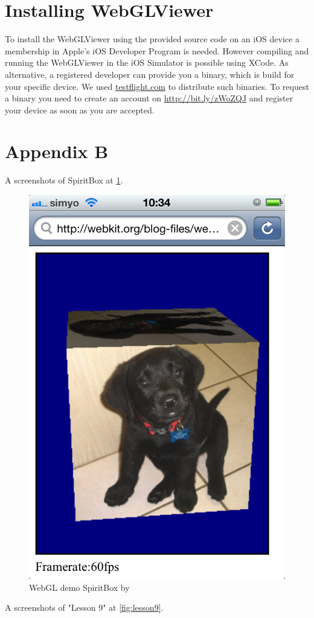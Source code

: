 \documentclass[12pt,journal,compsoc]{IEEEtran}
\begin{document}
\appendices
\section*{Installing WebGLViewer}
To install the WebGLViewer using the provided source code on an iOS device a membership in Apple's iOS Developer Program is needed. However compiling and running the WebGLViewer in the iOS Simulator is possible using XCode. As alternative, a registered developer can provide you a binary, which is build for your specific device. We used \url{testflight.com} to distribute such binaries. To request a binary you need to create an account on \url{http://bit.ly/zWoZQJ} and register your device as soon as you are accepted.

\section*{Appendix B}
A screenshots of SpiritBox at \ref{fig:spiritbox}.
\begin{figure}
	\centerline{\includegraphics[width=0.7\columnwidth]{grafiken/SpiritBox}}
	\caption{WebGL demo SpiritBox by \cite{SpiritBox}}
	\label{fig:spiritbox}
\end{figure}

A screenshots of "Lesson 9" at \ref{fig:lesson9}.
\end{document}

